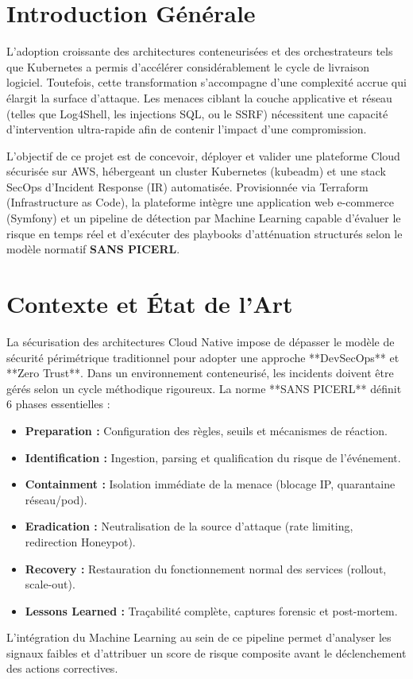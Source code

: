 \documentclass[12pt,a4paper]{report}
\begin{document}
\chapter{Introduction Générale}
L'adoption croissante des architectures conteneurisées et des orchestrateurs tels que Kubernetes a permis d'accélérer considérablement le cycle de livraison logiciel. Toutefois, cette transformation s'accompagne d'une complexité accrue qui élargit la surface d'attaque. Les menaces ciblant la couche applicative et réseau (telles que Log4Shell, les injections SQL, ou le SSRF) nécessitent une capacité d'intervention ultra-rapide afin de contenir l'impact d'une compromission.

L'objectif de ce projet est de concevoir, déployer et valider une plateforme Cloud sécurisée sur AWS, hébergeant un cluster Kubernetes (kubeadm) et une stack SecOps d'Incident Response (IR) automatisée. Provisionnée via Terraform (Infrastructure as Code), la plateforme intègre une application web e-commerce (Symfony) et un pipeline de détection par Machine Learning capable d'évaluer le risque en temps réel et d'exécuter des playbooks d'atténuation structurés selon le modèle normatif \textbf{SANS PICERL}.

\chapter{Contexte et État de l'Art}
La sécurisation des architectures Cloud Native impose de dépasser le modèle de sécurité périmétrique traditionnel pour adopter une approche **DevSecOps** et **Zero Trust**. Dans un environnement conteneurisé, les incidents doivent être gérés selon un cycle méthodique rigoureux. La norme **SANS PICERL** définit 6 phases essentielles :
\begin{itemize}
    \item \textbf{Preparation :} Configuration des règles, seuils et mécanismes de réaction.
    \item \textbf{Identification :} Ingestion, parsing et qualification du risque de l'événement.
    \item \textbf{Containment :} Isolation immédiate de la menace (blocage IP, quarantaine réseau/pod).
    \item \textbf{Eradication :} Neutralisation de la source d'attaque (rate limiting, redirection Honeypot).
    \item \textbf{Recovery :} Restauration du fonctionnement normal des services (rollout, scale-out).
    \item \textbf{Lessons Learned :} Traçabilité complète, captures forensic et post-mortem.
\end{itemize}
L'intégration du Machine Learning au sein de ce pipeline permet d'analyser les signaux faibles et d'attribuer un score de risque composite avant le déclenchement des actions correctives.
\end{document}
